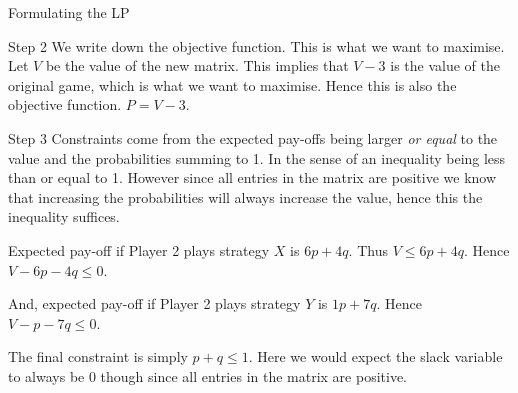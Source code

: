 \documentclass[8pt]{beamer}
\begin{document}
\begin{frame}{Formulating the LP}

\begin{exampleblock}{Step 2}
	We write down the objective function. This is what we want to maximise.
	Let $V$ be the value of the new matrix.  This implies that $V-3$ is the value of the original game, which is what we want to maximise. Hence this is also the objective function. $P=V-3$.
	
\end{exampleblock}

\begin{exampleblock}{Step 3}
	Constraints come from the expected pay-offs being larger \emph{or equal} to the value and the probabilities summing to 1. In the sense of an inequality being less than or equal to 1. However since all entries in the matrix are positive we know that increasing the probabilities will always increase the value, hence this the inequality suffices.  
	
Expected pay-off if Player 2 plays strategy $X$ is  $6p+4q$. Thus  $V\leq 6p+4q$. Hence  $V-6p-4q\leq 0$.

And, expected pay-off if Player 2 plays strategy $Y$ is  $1p+7q$. Hence  $V-p-7q\leq 0$. 

The final constraint is simply $p+q \leq 1$. Here we would expect the slack variable to always be 0 though since all entries in the matrix are positive. 
\end{exampleblock}
\end{frame}
\end{document}
